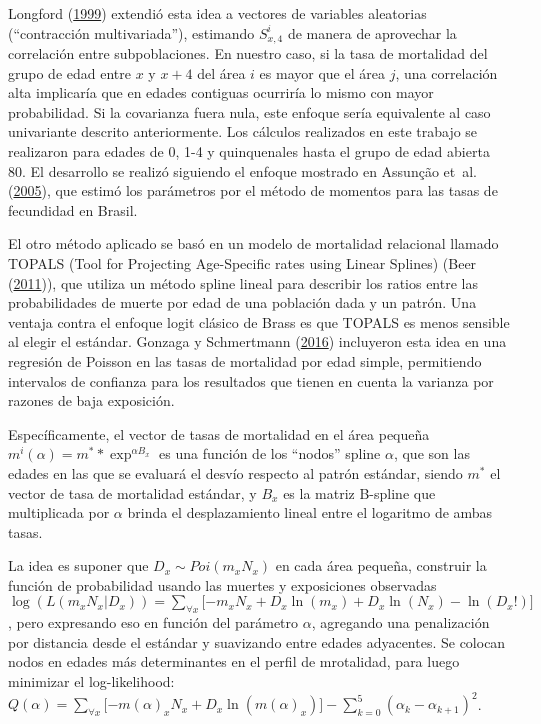 \documentclass[12pt,spanish,]{article}
\begin{document}
Longford (\protect\hyperlink{ref-Longford1999}{1999}) extendió esta idea
a vectores de variables aleatorias (``contracción multivariada''),
estimando \(S_{x,4}^{i}\) de manera de aprovechar la correlación entre
subpoblaciones. En nuestro caso, si la tasa de mortalidad del grupo de
edad entre \(x\) y \(x+4\) del área \(i\) es mayor que el área \(j\),
una correlación alta implicaría que en edades contiguas ocurriría lo
mismo con mayor probabilidad. Si la covarianza fuera nula, este enfoque
sería equivalente al caso univariante descrito anteriormente. Los
cálculos realizados en este trabajo se realizaron para edades de 0, 1-4
y quinquenales hasta el grupo de edad abierta 80. El desarrollo se
realizó siguiendo el enfoque mostrado en Assunção et~al.
(\protect\hyperlink{ref-Assuncao2005}{2005}), que estimó los parámetros
por el método de momentos para las tasas de fecundidad en Brasil.

El otro método aplicado se basó en un modelo de mortalidad relacional
llamado TOPALS (Tool for Projecting Age-Specific rates using Linear
Splines) (Beer (\protect\hyperlink{ref-deBeer2011}{2011})), que utiliza
un método spline lineal para describir los ratios entre las
probabilidades de muerte por edad de una población dada y un patrón. Una
ventaja contra el enfoque logit clásico de Brass es que TOPALS es menos
sensible al elegir el estándar. Gonzaga y Schmertmann
(\protect\hyperlink{ref-Gonzaga_Schmertmann_2016}{2016}) incluyeron esta
idea en una regresión de Poisson en las tasas de mortalidad por edad
simple, permitiendo intervalos de confianza para los resultados que
tienen en cuenta la varianza por razones de baja exposición.

Específicamente, el vector de tasas de mortalidad en el área pequeña
\(m^{i}(\alpha) = m^{*}*\exp^{\alpha B_{x}}\) es una función de los
``nodos'' spline \(\alpha\), que son las edades en las que se evaluará
el desvío respecto al patrón estándar, siendo \(m^*\) el vector de tasa
de mortalidad estándar, y \(B_{x}\) es la matriz B-spline que
multiplicada por \(\alpha\) brinda el desplazamiento lineal entre el
logaritmo de ambas tasas.

La idea es suponer que \(D_{x}\sim Poi (m_ {x} N_ {x})\) en cada área
pequeña, construir la función de probabilidad usando las muertes y
exposiciones observadas
\(\log(L(m_{x}N_{x}|D_{x}))=\sum_{\forall x}{\lbrack -m_{x}N_{x}+D_{x}\ln (m_{x})+D_{x}\ln (N_{x})-\ln (D_{x}!)\rbrack}\),
pero expresando eso en función del parámetro \(\alpha\), agregando una
penalización por distancia desde el estándar y suavizando entre edades
adyacentes. Se colocan nodos en edades más determinantes en el perfil de
mrotalidad, para luego minimizar el log-likelihood:
\(Q(\alpha )=\sum_{\forall x}{\lbrack -m(\alpha )_{x}N_{x}+D_{x}\ln(m(\alpha )_{x})\rbrack }-\sum_{k=0}^{5}{(\alpha _{k}-\alpha _{k+1})^{2}}\).
\end{document}
